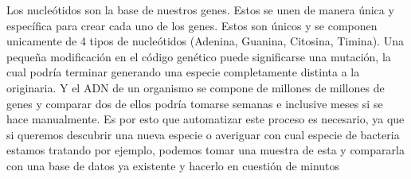 \documentclass{article}
\begin{document}
%


Los nucleótidos son la base de nuestros genes. Estos se unen de manera única y específica para crear cada uno de los genes. Estos son únicos y se componen unicamente de 4 tipos de nucleótidos (Adenina, Guanina, Citosina, Timina). 
Una pequeña modificación en el código genético puede significarse una mutación, la cual podría terminar generando una especie completamente distinta a la originaria. 
Y el ADN de un organismo se compone de millones de millones de genes y comparar dos de ellos podría tomarse semanas e inclusive meses si se hace manualmente. Es por esto que automatizar este proceso es necesario, ya que si queremos descubrir una nueva especie o averiguar con cual especie de bacteria estamos tratando por ejemplo, podemos tomar una muestra de esta y compararla con una base de datos ya existente y hacerlo en cuestión de minutos




\end{document}
